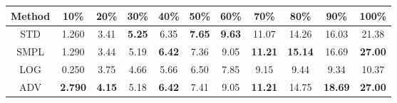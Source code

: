 \documentclass{standalone}
\begin{document}
\begin{tabular}{c|cccccccccc}
      \toprule
      Method & 10\% & 20\% & 30\% & 40\% & 50\% & 60\% & 70\% & 80\% & 90\% & 100\% \\
      \midrule
STD & 1.260 & 3.41 & \textbf{5.25} & 6.35 & \textbf{7.65} & \textbf{9.63} & 11.07 & 14.26 & 16.03 & 21.38\\
SMPL & 1.290 & 3.44 & 5.19 & \textbf{6.42} & 7.36 & 9.05 & \textbf{11.21} & \textbf{15.14} & 16.69 & \textbf{27.00}\\
LOG & 0.250 & 3.75 & 4.66 & 5.66 & 6.50 & 7.85 & 9.15 & 9.44 & 9.34 & 10.37\\
ADV & \textbf{2.790} & \textbf{4.15} & 5.18 & \textbf{6.42} & 7.41 & 9.05 & \textbf{11.21} & 14.75 & \textbf{18.69} & \textbf{27.00}\\
  \bottomrule
\end{tabular}
\end{document}
